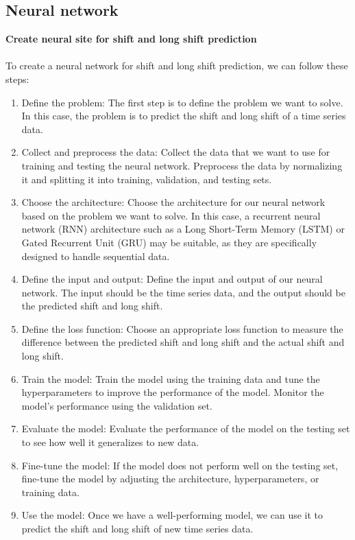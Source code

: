         \subsection{Neural network} \label{subsec:neural}
        \textbf{Create neural site for shift and long shift prediction}\\
        \\
        To create a neural network for shift and long shift prediction, we can follow these steps:
        \begin{enumerate}
            \item Define the problem: The first step is to define the problem we want to solve. In this case, the
            problem is to predict the shift and long shift of a time series data.
            \item Collect and preprocess the data: Collect the data that we want to use for training and
            testing the neural network. Preprocess the data by normalizing it and splitting it into training,
            validation, and testing sets.
            \item Choose the architecture: Choose the architecture for our neural network based on the problem
            we want to solve. In this case, a recurrent neural network (RNN) architecture such as a Long Short-Term
            Memory (LSTM) or Gated Recurrent Unit (GRU) may be suitable, as they are specifically designed to handle
            sequential data.
            \item Define the input and output: Define the input and output of our neural network. The input should
            be the time series data, and the output should be the predicted shift and long shift.
            \item Define the loss function: Choose an appropriate loss function to measure the difference
            between the predicted shift and long shift and the actual shift and long shift.
            \item Train the model: Train the model using the training data and tune the hyperparameters to
            improve the performance of the model. Monitor the model's performance using the validation set.
            \item Evaluate the model: Evaluate the performance of the model on the testing set to see how well
            it generalizes to new data.
            \item Fine-tune the model: If the model does not perform well on the testing set, fine-tune the model by
            adjusting the architecture, hyperparameters, or training data.
            \item Use the model: Once we have a well-performing model, we can use it to predict the
            shift and long shift of new time series data.
        \end{enumerate}
